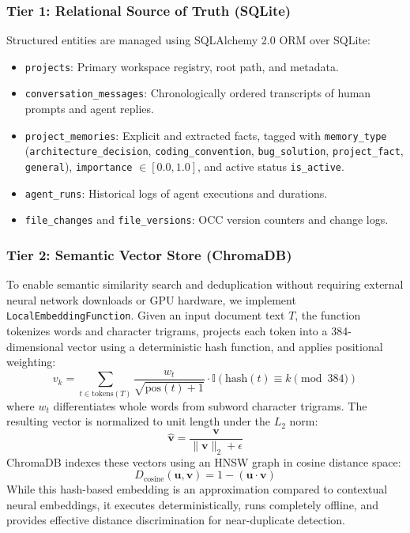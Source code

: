\documentclass[conference]{IEEEtran}
\begin{document}
\subsubsection{Tier 1: Relational Source of Truth (SQLite)}
Structured entities are managed using SQLAlchemy 2.0 ORM over SQLite:
\begin{itemize}
    \item \texttt{projects}: Primary workspace registry, root path, and metadata.
    \item \texttt{conversation\_messages}: Chronologically ordered transcripts of human prompts and agent replies.
    \item \texttt{project\_memories}: Explicit and extracted facts, tagged with \texttt{memory\_type} (\texttt{architecture\_decision}, \texttt{coding\_convention}, \texttt{bug\_solution}, \texttt{project\_fact}, \texttt{general}), \texttt{importance} $\in [0.0, 1.0]$, and active status \texttt{is\_active}.
    \item \texttt{agent\_runs}: Historical logs of agent executions and durations.
    \item \texttt{file\_changes} and \texttt{file\_versions}: OCC version counters and change logs.
\end{itemize}

\subsubsection{Tier 2: Semantic Vector Store (ChromaDB)}
To enable semantic similarity search and deduplication without requiring external neural network downloads or GPU hardware, we implement \texttt{LocalEmbeddingFunction}. Given an input document text $T$, the function tokenizes words and character trigrams, projects each token into a 384-dimensional vector using a deterministic hash function, and applies positional weighting:
\begin{equation}
v_k = \sum_{t \in \text{tokens}(T)} \frac{w_t}{\sqrt{\text{pos}(t) + 1}} \cdot \mathbb{I}(\text{hash}(t) \equiv k \!\!\!\pmod{384})
\end{equation}
where $w_t$ differentiates whole words from subword character trigrams. The resulting vector is normalized to unit length under the $L_2$ norm:
\begin{equation}
\hat{\mathbf{v}} = \frac{\mathbf{v}}{\|\mathbf{v}\|_2 + \epsilon}
\end{equation}
ChromaDB indexes these vectors using an HNSW graph in cosine distance space:
\begin{equation}
D_{\text{cosine}}(\mathbf{u}, \mathbf{v}) = 1 - (\mathbf{u} \cdot \mathbf{v})
\end{equation}
While this hash-based embedding is an approximation compared to contextual neural embeddings, it executes deterministically, runs completely offline, and provides effective distance discrimination for near-duplicate detection.
\end{document}
